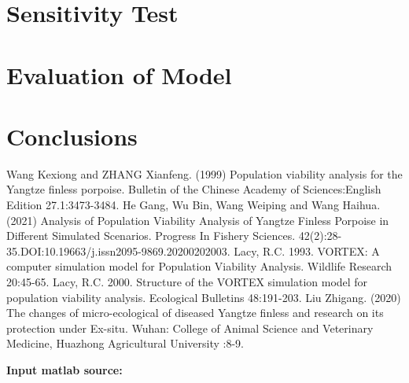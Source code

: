 \documentclass{mcmthesis}
\numberwithin{figure}{section}
\numberwithin{table}{section}
\numberwithin{equation}{section}
\begin{document}
\section{Sensitivity Test}

\section{Evaluation of Model}

\section{Conclusions}

\newpage
{}
\memodate{\today}

\begin{memo}[report]
  
\end{memo}




\newpage


\begin{thebibliography}{99}
 Wang Kexiong and ZHANG Xianfeng. (1999) Population viability analysis for the Yangtze finless porpoise. Bulletin of the Chinese Academy of Sciences:English Edition 27.1:3473-3484.
 He Gang, Wu Bin, Wang Weiping and Wang Haihua. (2021) Analysis of Population Viability Analysis of Yangtze Finless Porpoise in Different Simulated Scenarios. Progress In Fishery Sciences. 42(2):28-35.DOI:10.19663/j.issn2095-9869.20200202003.
 Lacy, R.C. 1993. VORTEX: A computer simulation model for Population Viability Analysis. Wildlife Research 20:45-65.
 Lacy, R.C. 2000. Structure of the VORTEX simulation model for population viability analysis. Ecological Bulletins 48:191-203.
 Liu Zhigang. (2020) The changes of micro-ecological of diseased Yangtze finless and research on its protection under Ex-situ. Wuhan: College of Animal Science and Veterinary Medicine, Huazhong Agricultural University :8-9.

\end{thebibliography}


\newpage


\lhead{\small\sffamily \team}

\begin{appendices}




\textbf{\textcolor[rgb]{0.98,0.00,0.00}{Input matlab source:}}




\end{appendices}
\end{document}
